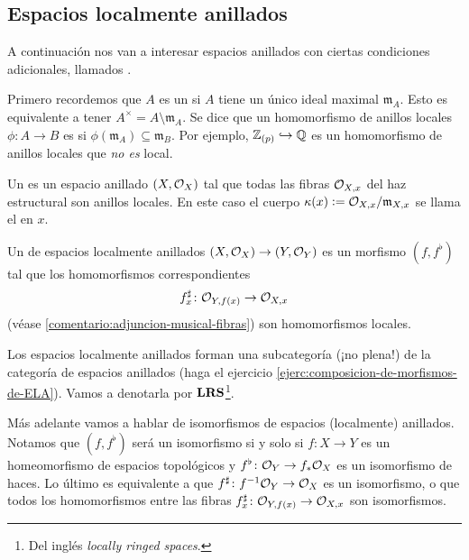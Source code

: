 \documentclass{article}
\numberwithin{equation}{section}
\theoremstyle{definition}
\begin{document}
\subsection{Espacios localmente anillados}

A continuación nos van a interesar espacios anillados con ciertas condiciones
adicionales, llamados .

Primero recordemos que $A$ es un  si $A$ tiene un único ideal
maximal $\mathfrak{m}_A$. Esto es equivalente a tener
$A^\times = A\setminus \mathfrak{m}_A$. Se dice que un homomorfismo de anillos
locales $\phi\colon A\to B$ es  si
$\phi (\mathfrak{m}_A) \subseteq \mathfrak{m}_B$. Por ejemplo,
$\mathbb{Z}_{(p)} \hookrightarrow \mathbb{Q}$ es un homomorfismo de anillos locales que
\emph{no es} local.

\begin{definicion}
  \label{dfn:espacios-localmente-anillados}
  Un  es un espacio anillado $(X,\mathcal{O}_X)$
  tal que todas las fibras $\mathcal{O}_{X,x}$ del haz estructural son anillos
  locales. En este caso el cuerpo $\kappa (x) \mathrel{\mathop:}= \mathcal{O}_{X,x}/\mathfrak{m}_{X,x}$
  se llama el  en $x$.

  Un  de espacios localmente anillados $(X,\mathcal{O}_X) \to (Y,\mathcal{O}_Y)$
  es un morfismo $(f,f^\flat)$ tal que los homomorfismos correspondientes
  $$f^\sharp_x\colon \mathcal{O}_{Y,f(x)} \to \mathcal{O}_{X,x}$$
  (véase \ref{comentario:adjuncion-musical-fibras}) son homomorfismos locales.
\end{definicion}

Los espacios localmente anillados forman una subcategoría (¡no plena!) de
la categoría de espacios anillados (haga el ejercicio
\ref{ejerc:composicion-de-morfismos-de-ELA}). Vamos a denotarla por
$\text{\bf LRS}$\footnote{Del inglés \emph{locally ringed spaces}.}.

\begin{comentario}
  Más adelante vamos a hablar de isomorfismos de espacios (localmente)
  anillados. Notamos que $(f,f^\flat)$ será un isomorfismo si y solo si
  $f\colon X\to Y$ es un homeomorfismo de espacios topológicos y
  $f^\flat\colon \mathcal{O}_Y \to f_* \mathcal{O}_X$ es un isomorfismo de haces. Lo último
  es equivalente a que $f^\sharp\colon f^{-1} \mathcal{O}_Y \to \mathcal{O}_X$ es un isomorfismo,
  o que todos los homomorfismos entre las fibras
  $f^\sharp_x\colon \mathcal{O}_{Y,f(x)} \to \mathcal{O}_{X,x}$ son isomorfismos.
\end{comentario}
\end{document}
